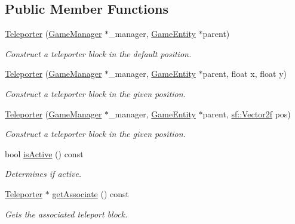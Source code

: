 \subsection*{Public Member Functions}
\begin{DoxyCompactItemize}
\item 
\mbox{\hyperlink{class_teleporter_a9850270a926b752104203d4bbc60fcff}{Teleporter}} (\mbox{\hyperlink{class_game_manager}{Game\+Manager}} $\ast$\+\_\+manager, \mbox{\hyperlink{class_game_entity}{Game\+Entity}} $\ast$parent)
\begin{DoxyCompactList}\small\item\em Construct a teleporter block in the default position. \end{DoxyCompactList}\item 
\mbox{\hyperlink{class_teleporter_ae501862b941bcf4a32fe15f998874f68}{Teleporter}} (\mbox{\hyperlink{class_game_manager}{Game\+Manager}} $\ast$\+\_\+manager, \mbox{\hyperlink{class_game_entity}{Game\+Entity}} $\ast$parent, float x, float y)
\begin{DoxyCompactList}\small\item\em Construct a teleporter block in the given position. \end{DoxyCompactList}\item 
\mbox{\hyperlink{class_teleporter_a153adbdf3cefa34334eb41aea2bb7176}{Teleporter}} (\mbox{\hyperlink{class_game_manager}{Game\+Manager}} $\ast$\+\_\+manager, \mbox{\hyperlink{class_game_entity}{Game\+Entity}} $\ast$parent, \mbox{\hyperlink{classsf_1_1_vector2}{sf\+::\+Vector2f}} pos)
\begin{DoxyCompactList}\small\item\em Construct a teleporter block in the given position. \end{DoxyCompactList}\item 
bool \mbox{\hyperlink{class_teleporter_a4fb9e6851132a1ffb8fbec7b95972ed1}{is\+Active}} () const
\begin{DoxyCompactList}\small\item\em Determines if active. \end{DoxyCompactList}\item 
\mbox{\label{class_teleporter_a99089d9cc765596a53b1cdd3e15f282e}} 
\mbox{\hyperlink{class_teleporter}{Teleporter}} $\ast$ \mbox{\hyperlink{class_teleporter_a99089d9cc765596a53b1cdd3e15f282e}{get\+Associate}} () const
\begin{DoxyCompactList}\small\item\em Gets the associated teleport block. \end{DoxyCompactList}\item 

\end{DoxyCompactItemize}
